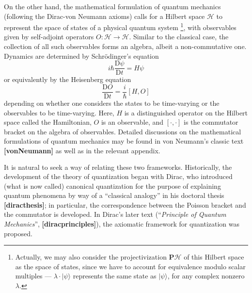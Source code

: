 \documentclass{tufte-handout}
\def \D {\mathrm{D}}
\begin{document}
On the other hand, the mathematical formulation of quantum mechanics (following the Dirac-von Neumann axioms) calls for a Hilbert space $\mathcal{H}$ to represent the space of states of a physical quantum system \footnote{Actually, we may also consider the projectivization $\mathbf{P}\mathcal{H}$ of this Hilbert space as the space of states, since we have to account for equivalence modulo scalar multiples --- $\lambda \cdot |\psi\rangle$ represents the same state as $|\psi\rangle$, for any complex nonzero $\lambda$.}, with observables given by self-adjoint operators $O: \mathcal{H} \to \mathcal{H}$. Similar to the classical case, the collection of all such observables forms an algebra, albeit a non-commutative one. Dynamics are determined by Schr\"{o}dinger's equation
$$
i\hbar \frac{\D\psi}{\D t} = H\psi
$$
or equivalently by the Heisenberg equation
$$
\frac{\D O}{\D t} = \frac{i}{\hbar}[H,O]
$$
depending on whether one considers the states to be time-varying or the observables to be time-varying. Here, $H$ is a distinguished operator on the Hilbert space called the Hamiltonian, $O$ is an observable, and $[\cdot,\cdot]$ is the commutator bracket on the algebra of observables.
Detailed discussions on the mathematical formulations of quantum mechanics may be found in von Neumann's classic text \textbf{[vonNeumann]} as well as in the relevant appendix.

It is natural to seek a way of relating these two frameworks. Historically, the development of the theory of quantization began with Dirac, who introduced (what is now called) canonical quantization for the purpose of explaining quantum phenomena by way of a ``classical analogy'' in his doctoral thesis \textbf{[diracthesis]}; in particular, the correspondence between the Poisson bracket and the commutator is developed. In Dirac's later text (``\emph{Principle of Quantum Mechanics}'', \textbf{[diracprinciples]}), the axiomatic framework for quantization was proposed.
\end{document}

